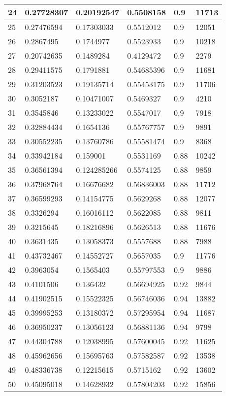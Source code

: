 \begin{longtable}{|l|l|l|l|l|l|}
24 & 0.27728307 & 0.20192547 & 0.5508158 & 0.9 & 11713 \\ \hline 
25 & 0.27476594 & 0.17303033 & 0.5512012 & 0.9 & 12051 \\ \hline 
26 & 0.2867495 & 0.1744977 & 0.5523933 & 0.9 & 10218 \\ \hline 
27 & 0.20742635 & 0.1489284 & 0.4129472 & 0.9 & 2279 \\ \hline 
28 & 0.29411575 & 0.1791881 & 0.54685396 & 0.9 & 11681 \\ \hline 
29 & 0.31203523 & 0.19135714 & 0.55453175 & 0.9 & 11706 \\ \hline 
30 & 0.3052187 & 0.10471007 & 0.5469327 & 0.9 & 4210 \\ \hline 
31 & 0.3545846 & 0.13233022 & 0.5547017 & 0.9 & 7918 \\ \hline 
32 & 0.32884434 & 0.1654136 & 0.55767757 & 0.9 & 9891 \\ \hline 
33 & 0.30552235 & 0.13760786 & 0.55581474 & 0.9 & 8368 \\ \hline 
34 & 0.33942184 & 0.159001 & 0.5531169 & 0.88 & 10242 \\ \hline 
35 & 0.36561394 & 0.124285266 & 0.5574125 & 0.88 & 9859 \\ \hline 
36 & 0.37968764 & 0.16676682 & 0.56836003 & 0.88 & 11712 \\ \hline 
37 & 0.36599293 & 0.14154775 & 0.5629268 & 0.88 & 12077 \\ \hline 
38 & 0.3326294 & 0.16016112 & 0.5622085 & 0.88 & 9811 \\ \hline 
39 & 0.3215645 & 0.18216896 & 0.5626513 & 0.88 & 11676 \\ \hline 
40 & 0.3631435 & 0.13058373 & 0.5557688 & 0.88 & 7988 \\ \hline 
41 & 0.43732467 & 0.14552727 & 0.5657035 & 0.9 & 11776 \\ \hline 
42 & 0.3963054 & 0.1565403 & 0.55797553 & 0.9 & 9886 \\ \hline 
43 & 0.4101506 & 0.136432 & 0.56694925 & 0.92 & 9844 \\ \hline 
44 & 0.41902515 & 0.15522325 & 0.56746036 & 0.94 & 13882 \\ \hline 
45 & 0.39995253 & 0.13180372 & 0.57295954 & 0.94 & 11687 \\ \hline 
46 & 0.36950237 & 0.13056123 & 0.56881136 & 0.94 & 9798 \\ \hline 
47 & 0.44304788 & 0.12038995 & 0.57600045 & 0.92 & 11625 \\ \hline 
48 & 0.45962656 & 0.15695763 & 0.57582587 & 0.92 & 13538 \\ \hline 
49 & 0.48336738 & 0.12215615 & 0.5715162 & 0.92 & 13602 \\ \hline 
50 & 0.45095018 & 0.14628932 & 0.57804203 & 0.92 & 15856 \\ \hline 
\end{longtable}